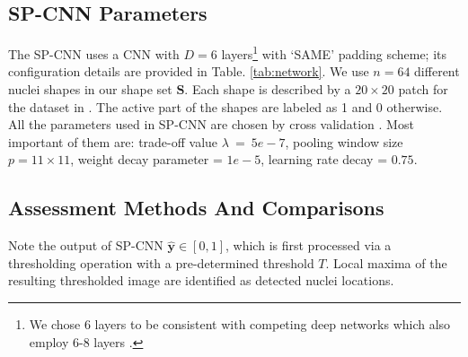 \documentclass{article}
\begin{document}
\subsection{SP-CNN Parameters}
\label{sec:params}
The SP-CNN uses a CNN with $D=6$ layers\footnote{We chose 6 layers to be consistent with competing deep networks which also employ 6-8 layers \cite{SC_CNN,Xing2016}.} with `SAME' padding scheme; its configuration details are provided in Table. \ref{tab:network}. We use $n = 64$ different nuclei shapes in our shape set $\mathbf{S}$. Each shape is described by a $20 \times 20$ patch for the dataset in \cite{SC_CNN}. The active part of the shapes are labeled as 1 and 0 otherwise. All the parameters used in SP-CNN are chosen by cross validation \cite{monga2017,haddadpour2012coordination}. Most important of them are: trade-off value $\lambda~=~5e-7$, pooling window size $p = 11\times 11$, weight decay parameter = $1e-5$, learning rate decay = $0.75$.
\begin{table}[t]
	\centering
	\caption{\ninept The Configuration of The CNN Used in SP-CNN}\vspace{-3pt}
	\label{tab:network}
\vspace{-10pt}
\end{table}


\subsection{Assessment Methods And Comparisons}\vspace{-1pt}
\label{sec:assessment}
Note the output of SP-CNN $\mathbf{\hat{y}} \in [0,1]$, which is first processed via a thresholding operation with a pre-determined threshold $T$. Local maxima of the resulting thresholded image are identified as detected nuclei locations.\vspace{-0pt}
\end{document}
